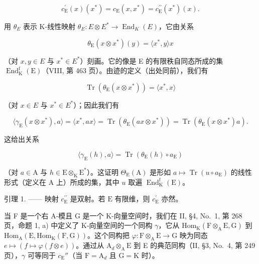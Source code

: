 \[
c _ {\mathrm{E}} ^ {\prime} (x) (x ^ {*}) = c _ {\mathrm{E}} (x, x ^ {*}) = c _ {\mathrm{E}} ^ {\prime \prime} (x ^ {*}) (x).
\]

用 \(\theta_{E}\) 表示 K-线性映射 \(\theta_{E}: E \otimes E^{*} \to \operatorname{End}_{K}(E)\)，它由关系

\[
\theta_ {\mathrm{E}} (x \otimes x ^ {*}) (y) = \langle x ^ {*}, y \rangle x
\]

（对 \(x, y \in E\) 与 \(x^{*} \in E^{*}\)）刻画。它的像是 E 的有限秩自同态所成的集 \(\operatorname{End}_{\mathrm{K}}^{\mathrm{f}}(\mathrm{E})\)（VIII, 第 463 页）。由迹的定义（出处同前），我们有

\[
\operatorname{Tr} \left(\theta_ {\mathrm{E}} \left(x \otimes x ^ {*}\right)\right) = \langle x ^ {*}, x \rangle
\]

（对 \(x \in E\) 与 \(x^{*} \in E^{*}\)）；因此我们有

\[
\langle \gamma_ {\mathrm{E}} (x \otimes x ^ {*}), a \rangle = \langle x ^ {*}, a x \rangle = \operatorname{Tr} (\theta_ {\mathrm{E}} (a x \otimes x ^ {*})) = \operatorname{Tr} (\theta_ {\mathrm{E}} (x \otimes x ^ {*}) a).
\]

这给出关系

\[
\langle \gamma_ {\mathrm{E}} (h), a \rangle = \operatorname{Tr} (\theta_ {\mathrm{E}} (h) \circ a _ {\mathrm{E}})
\]

（对 \(a \in \mathrm{A}\) 与 \(h \in \mathrm{E} \otimes_{\mathrm{K}} \mathrm{E}^*\)）。这证明 \(\Theta_{\mathrm{E}}(\mathrm{A})\) 是形如 \(a \mapsto \operatorname{Tr}(u \circ a_{\mathrm{E}})\) 的线性形式（定义在 \(\mathrm{A}\) 上）所成的集，其中 \(u\) 取遍 \(\operatorname{End}_{\mathrm{K}}^{\mathrm{f}}(\mathrm{E})\)。

引理 1. —— 映射 \(c_{\mathrm{E}}^{\prime \prime}\) 是双射。若 \(\mathrm{E}\) 有限维，则 \(c_{\mathrm{E}}^{\prime}\) 亦然。

当 F 是一个右 A-模且 G 是一个 K-向量空间时，我们在 II, §4, No.~1, 第 268 页，命题 1, a) 中定义了 K-向量空间的一个同构 \(\gamma\)，它从 \(\mathrm{Hom}_{\mathrm{K}}(\mathrm{F} \otimes_{\mathrm{A}} \mathrm{E}, \mathrm{G})\) 到 \(\mathrm{Hom}_{\mathrm{A}}(\mathrm{E}, \mathrm{Hom}_{\mathrm{K}}(\mathrm{F}, \mathrm{G}))\)。这个同构把 \(\varphi : \mathrm{F} \otimes_{\mathrm{A}} \mathrm{E} \to \mathrm{G}\) 映为同态 \(e \mapsto (f \mapsto \varphi(f \otimes e))\)。通过从 \(\mathrm{A}_d \otimes_{\mathrm{A}} \mathrm{E}\) 到 E 的典范同构（II, §3, No.~4, 第 249 页），\(\gamma\) 可等同于 \(c_{\mathrm{E}}''\)（当 \(\mathrm{F} = \mathrm{A}_d\) 且 \(\mathrm{G} = \mathrm{K}\) 时）。


